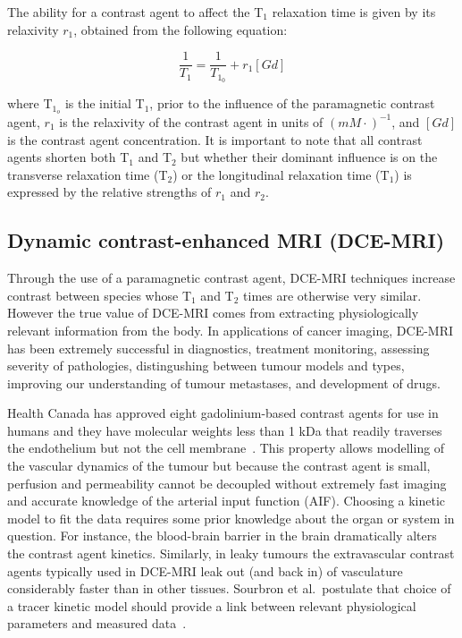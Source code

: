 The ability for a contrast agent to affect the T$_1$ relaxation time is given by its relaxivity $r_1$, obtained from the following equation:

\begin{equation}
\frac{1}{T_{1}} = \frac{1}{T_{1_0}} + r_1 [Gd]
\end{equation}

where T$_{1_o}$ is the initial T$_1$, prior to the influence of the paramagnetic contrast agent, $r_1$ is the relaxivity of the contrast agent in units of $(mM\cdot)^{-1}$, and $[Gd]$ is the contrast agent concentration.
It is important to note that all contrast agents shorten both T$_1$ and T$_2$ but whether their dominant influence is on the transverse relaxation time (T$_2$) or the longitudinal relaxation time (T$_1$) is expressed by the relative strengths of $r_1$ and $r_2$.

\subsection{Dynamic contrast-enhanced MRI (\acs{DCE-MRI})}

Through the use of a paramagnetic contrast agent, \acs{DCE-MRI} techniques increase contrast between species whose T$_1$ and T$_2$ times are otherwise very similar.
However the true value of \acs{DCE-MRI} comes from extracting physiologically relevant information from the body. 
In applications of cancer imaging, \acs{DCE-MRI} has been extremely successful in diagnostics, treatment monitoring, assessing severity of pathologies, distingushing between tumour models and types, improving our understanding of tumour metastases, and development of drugs.

Health Canada has approved eight gadolinium-based contrast agents for use in humans and they have molecular weights less than 1 \acs{kDa} that readily traverses the endothelium but not the cell membrane~\cite{WalkerSamuel:2006ch}. 
This property allows modelling of the vascular dynamics of the tumour but because the contrast agent is small, perfusion and permeability cannot be decoupled without extremely fast imaging and accurate knowledge of the arterial input function (\acs{AIF})\cite{Sourbron:2011ce}.
Choosing a kinetic model to fit the data requires some prior knowledge about the organ or system in question. 
For instance, the blood-brain barrier in the brain dramatically alters the contrast agent kinetics. 
Similarly, in leaky tumours the extravascular contrast agents typically used in \acs{DCE-MRI} leak out (and back in) of vasculature considerably faster than in other tissues. 
Sourbron et al.\ postulate that choice of a tracer kinetic model should provide a link between relevant physiological parameters and measured data~\cite{Sourbron:2011ce}. 


